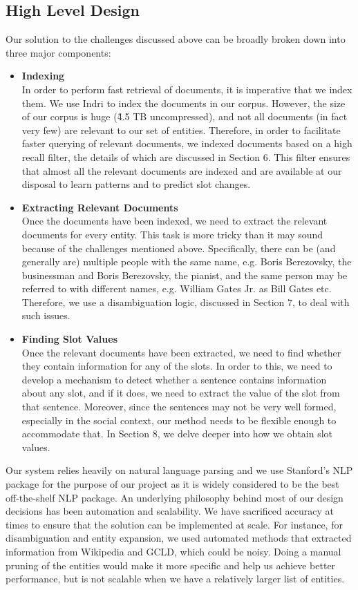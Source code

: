 \subsection{High Level Design}
Our solution to the challenges discussed above can be broadly broken down into three major components:
\begin{itemize}
\item \textbf{Indexing} \\
In order to perform fast retrieval of documents, it is imperative that we index them. We use Indri to index the documents in our corpus. However, the size of our corpus is huge (\~4.5 TB uncompressed), and not all documents (in fact very few) are relevant to our set of entities. Therefore, in order to facilitate faster querying of relevant documents, we indexed documents based on a high recall filter, the details of which are discussed in Section 6. This filter ensures that almost all the relevant documents are indexed and are available at our disposal to learn patterns and to predict slot changes.
\item \textbf{Extracting Relevant Documents} \\
Once the documents have been indexed, we need to extract the relevant documents for every entity. This task is more tricky than it may sound because of the challenges mentioned above. Specifically, there can be (and generally are) multiple people with the same name, e.g. Boris Berezovsky, the businessman and Boris Berezovsky, the pianist, and the same person may be referred to with different names, e.g. William Gates Jr. as Bill Gates etc. Therefore, we use a disambiguation logic, discussed in Section 7, to deal with such issues.
\item \textbf{Finding Slot Values} \\
Once the relevant documents have been extracted, we need to find whether they contain information for any of the slots. In order to this, we need to develop a mechanism to detect whether a sentence contains information about any slot, and if it does, we need to extract the value of the slot from that sentence. Moreover, since the sentences may not be very well formed, especially in the social context, our method needs to be flexible enough to accommodate that. In Section 8, we delve deeper into how we obtain slot values. 
\end{itemize}
Our system relies heavily on natural language parsing and we use Stanford’s NLP package for the purpose of our project as it is widely considered to be the best off-the-shelf NLP package. An underlying philosophy behind most of our design decisions has been automation and scalability. We have sacrificed accuracy at times to ensure that the solution can be implemented at scale. For instance, for disambiguation and entity expansion, we used automated methods that extracted information from Wikipedia and GCLD, which could be noisy. Doing a manual pruning of the entities would make it more specific and help us achieve better performance, but is not scalable when we have a relatively larger list of entities.
